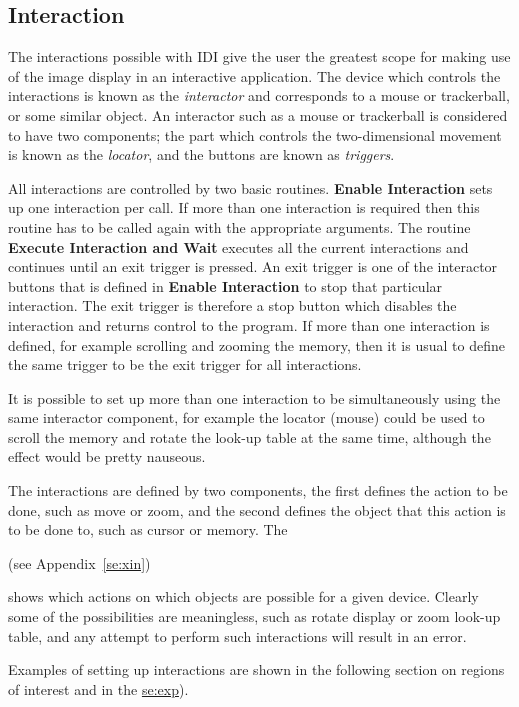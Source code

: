 \subsection{Interaction}

The interactions possible with IDI give the user the greatest scope for
making use of the image display in an interactive application. The
device which controls the interactions is known as the {\it interactor}
and corresponds to a mouse or trackerball, or some similar object.
An interactor such as a mouse or trackerball is considered to have two
components; the part which controls the two-dimensional movement is
known as the {\it locator}, and the buttons are known as {\it triggers}.

All interactions are controlled by two basic routines. {\bf Enable
Interaction} sets up one interaction per call. If more than one
interaction is required then this routine has to be called again with
the appropriate arguments. The routine {\bf Execute Interaction and
Wait} executes all the current interactions and continues until an exit
trigger is pressed. An exit trigger is one of the interactor buttons that
is defined in {\bf Enable Interaction} to stop that particular interaction.
The exit trigger is therefore a stop button which disables the interaction
and returns control to the program.
If more than one interaction is defined, for example scrolling and zooming
the memory, then it is usual to define the same trigger to be the exit
trigger for all interactions.

It is possible to set up more than one interaction to be simultaneously
using the same interactor component, for example the locator (mouse)
could be used to scroll the memory and rotate the look-up table at the
same time, although the effect would be pretty nauseous.

The interactions are defined by two components, the first defines the
action to be done, such as move or zoom, and the second defines the object
that this action is to be done to, such as cursor or memory.
The 
\begin{latexonly}
(see Appendix~\ref{se:xin}) 
\end{latexonly}
shows which actions on which objects are possible for a given
device. Clearly some of the possibilities are meaningless, such as rotate
display or zoom look-up table, and any attempt to perform such interactions
will result in an error.

Examples of setting up interactions are shown in the following section on
regions of interest and in the 
\hyperref{example program}{example program (appendix~}{}{se:exp}).

